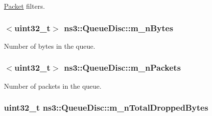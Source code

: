 \hyperlink{classns3_1_1Packet}{Packet} filters. 

\subsubsection[{\texorpdfstring{m\+\_\+n\+Bytes}{m_nBytes}}]{$<$uint32\+\_\+t$>$ ns3\+::\+Queue\+Disc\+::m\+\_\+n\+Bytes\hspace{0.3cm}{\ttfamily [private]}}\hypertarget{classns3_1_1QueueDisc_a5c9e0e5c858f333bb15089eea58a1e3b}{}\label{classns3_1_1QueueDisc_a5c9e0e5c858f333bb15089eea58a1e3b}


Number of bytes in the queue. 

\subsubsection[{\texorpdfstring{m\+\_\+n\+Packets}{m_nPackets}}]{$<$uint32\+\_\+t$>$ ns3\+::\+Queue\+Disc\+::m\+\_\+n\+Packets\hspace{0.3cm}{\ttfamily [private]}}\hypertarget{classns3_1_1QueueDisc_a7afc9edf0fdb517d088ebe8d3747fbef}{}\label{classns3_1_1QueueDisc_a7afc9edf0fdb517d088ebe8d3747fbef}


Number of packets in the queue. 

\subsubsection[{\texorpdfstring{m\+\_\+n\+Total\+Dropped\+Bytes}{m_nTotalDroppedBytes}}]{\setlength{\rightskip}{0pt plus 5cm}uint32\+\_\+t ns3\+::\+Queue\+Disc\+::m\+\_\+n\+Total\+Dropped\+Bytes\hspace{0.3cm}{\ttfamily [private]}}\hypertarget{classns3_1_1QueueDisc_a06645b0916c11b3da27195ed99ca8ce7}{}\label{classns3_1_1QueueDisc_a06645b0916c11b3da27195ed99ca8ce7}


